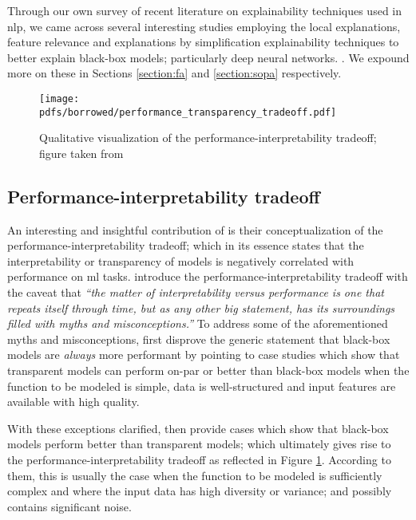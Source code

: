 Through our own survey of recent literature on explainability techniques used in
\ac{nlp}, we came across several interesting studies employing the local
explanations, feature relevance and explanations by simplification
explainability techniques to better explain black-box models; particularly deep
neural networks.
\citep{schwartz2018sopa,peng2018rational,suresh-etal-2019-distilling,wang2019state,jiang2020cold}.
We expound more on these in Sections \ref{section:fa} and \ref{section:sopa}
respectively.

\begin{figure}[t]
  \centering
  \texttt{[image: pdfs/borrowed/performance\_transparency\_tradeoff.pdf]}
  \caption{Qualitative visualization of the performance-interpretability tradeoff;
    figure taken from \citet{arrieta2020explainable}}
  \label{fig:performance_interpretability_tradeoff}
\end{figure}

\subsection{Performance-interpretability tradeoff}

\label{section:performance_interpretability_tradeoff}

An interesting and insightful contribution of \citet{arrieta2020explainable} is
their conceptualization of the performance-interpretability tradeoff; which in
its essence states that the interpretability or transparency of models is
negatively correlated with performance on \ac{ml} tasks. \citet[Page 18, Section
5.1]{arrieta2020explainable} introduce the performance-interpretability tradeoff
with the caveat that \textit{``the matter of interpretability versus performance
  is one that repeats itself through time, but as any other big statement, has
  its surroundings filled with myths and misconceptions.''} To address some of
the aforementioned myths and misconceptions, \citet{arrieta2020explainable}
first disprove the generic statement that black-box models are
\textit{always} more performant by pointing to case studies which show that
transparent models can perform on-par or better than black-box models when the
function to be modeled is simple, data is well-structured and input
features are available with high quality.

With these exceptions clarified, \citet{arrieta2020explainable} then provide cases
which show that black-box models perform better than transparent models; which
ultimately gives rise to the performance-interpretability tradeoff as
reflected in Figure \ref{fig:performance_interpretability_tradeoff}. According to
them, this is usually the case when the function to be modeled is sufficiently
complex and where the input data has high diversity or variance; and possibly
contains significant noise.

